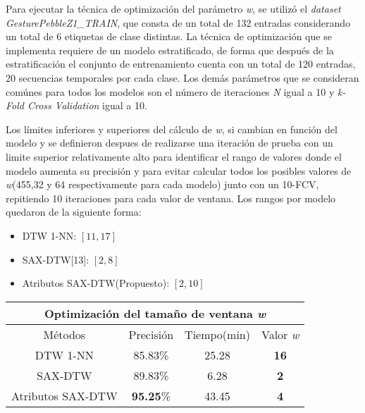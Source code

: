 \hfill\break
\justifying
Para ejecutar la técnica de optimización del parámetro \textit{w}, se utilizó el \textit{dataset} \textit{GesturePebbleZ1\_TRAIN}, que consta de un total de 132 entradas considerando un total de 6 etiquetas de clase distintas. La técnica de optimización que se implementa requiere de un modelo estratificado, de forma que después de la estratificación el conjunto de entrenamiento cuenta con un total de 120 entradas, 20 secuencias temporales por cada clase. Los demás parámetros que se consideran comúnes para todos los modelos son el número de iteraciones \textit{N} igual a 10 y \textit{k-Fold Cross Validation} igual a 10.

\hfill\break
\justifying
Los límites inferiores y superiores del cálculo de \textit{w}, si cambian en función del modelo y se definieron despues de realizarse una iteración de prueba con un limite superior relativamente alto para identificar el rango de valores donde el modelo aumenta su precisión y para evitar calcular todos los posibles valores de \textit{w}(455,32 y 64 respectivamente para cada modelo) junto con un 10-FCV, repitiendo 10 iteraciones para cada valor de ventana. Los rangos por modelo quedaron de la siguiente forma:
\begin{itemize}
	\item DTW 1-NN: $[11,17]$
	\item SAX-DTW[13]: $[2,8]$
	\item Atributos SAX-DTW(Propuesto): $[2,10]$
\end{itemize}

\begin{center}
	\begin{tabular}{c|c c c}
		\multicolumn{4}{c}{Optimización del tamaño de ventana \textit{w}} \\ \hline
		Métodos & Precisión & Tiempo(min) & Valor \textit{w} \\ \hline
		DTW 1-NN &  85.83\% & 25.28 & \textbf{16} \\
		SAX-DTW & 89.83\% & 6.28 & \textbf{2} \\
		Atributos SAX-DTW & \textbf{95.25}\% & 43.45 & \textbf{4} \\
	\end{tabular}
	\label{tabla_optimizacion_w}
\end{center}

